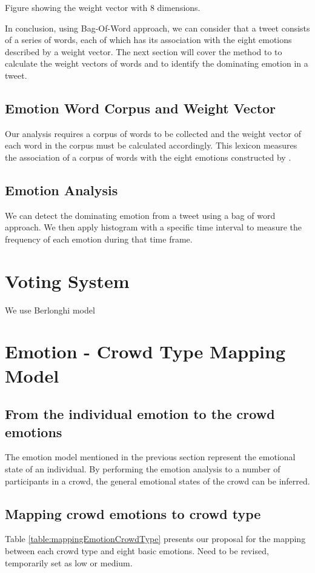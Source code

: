 Figure showing the weight vector with 8 dimensions.

In conclusion, using Bag-Of-Word approach, we can consider that a tweet consists of a series of words, each of which has its association with the eight emotions described by a weight vector. The next section will cover the method to to calculate the weight vectors of words and to identify the dominating emotion in a tweet.

\subsection{Emotion Word Corpus and Weight Vector}
Our analysis requires a corpus of words to be collected and the weight vector of each word in the corpus must be calculated accordingly.
This lexicon measures the association of a corpus of words with the eight emotions constructed by \citet{mohammad2014using}.

\subsection{Emotion Analysis}
We can detect the dominating emotion from a tweet using a bag of word approach. We then apply histogram with a specific time interval to measure the frequency of each emotion during that time frame.

\section{Voting System}

We use Berlonghi model

\section{Emotion - Crowd Type Mapping Model}

\subsection{From the individual emotion to the crowd emotions}
The emotion model mentioned in the previous section represent the emotional state of an individual. By performing the emotion analysis to a number of participants in a crowd, the general emotional states of the crowd can be inferred.

\subsection{Mapping crowd emotions to crowd type}
Table \ref{table:mappingEmotionCrowdType} presents our proposal for the mapping between each crowd type and eight basic emotions. Need to be revised, temporarily set as low or medium.

